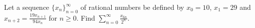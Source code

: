 Let a sequence $\lbrace x_n \rbrace_{n=0}^{\infty}$ of rational numbers be
defined by $x_0 = 10$, $x_1 = 29$ and $x_{n+2} = \frac{19x_{n+1}}{94x_n}$ for
$n \ge 0$. Find $\displaystyle{\sum_{n=0}^{\infty} \frac{x_{6n}}{2^n}}$.
